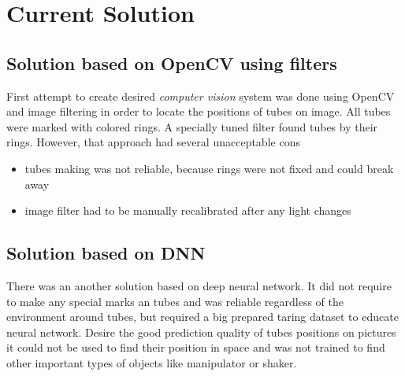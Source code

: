 \section{Current Solution}

\subsection{Solution based on OpenCV using filters}

First attempt to create desired \textit{computer vision} system was done using OpenCV and image filtering
in order to locate the positions of tubes on image. All tubes were marked with colored rings.
A specially tuned filter found tubes by their rings. However, that approach had several unacceptable cons
\begin{itemize}
	\item tubes making was not reliable, because rings were not fixed and could break away
	\item image filter had to be manually recalibrated after any light changes
\end{itemize}

\subsection{Solution based on DNN}

There was an another solution based on deep neural network. It did not require to make any special marks
an tubes and was reliable regardless of the environment around tubes, but required a big prepared taring dataset
to educate neural network. Desire the good prediction quality of tubes positions on pictures it could not be
used to find their position in space and was not trained to find other important types of objects like manipulator or shaker.

 
